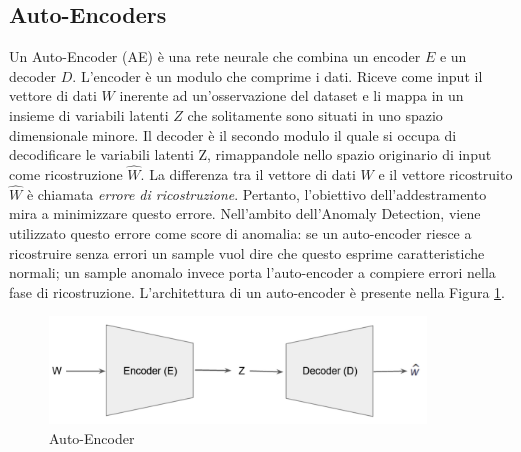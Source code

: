 \subsection{Auto-Encoders}
Un Auto-Encoder (AE) \cite{aggarwal2015outlier} è una rete neurale che combina un encoder $E$ e un decoder $D$. L'encoder è un modulo che comprime i dati. Riceve come input il vettore di dati $W$ inerente ad un'osservazione del dataset e li mappa in un insieme di variabili latenti $Z$ che solitamente sono situati in uno spazio dimensionale minore. Il decoder è il secondo modulo il quale si occupa di decodificare le variabili latenti Z, rimappandole nello spazio originario di input come ricostruzione $\widehat{W}$. La differenza tra il vettore di dati $W$ e il vettore ricostruito $\widehat{W}$ è chiamata \textit{errore di ricostruzione}. Pertanto, l'obiettivo dell'addestramento mira a minimizzare questo errore. Nell'ambito dell'Anomaly Detection, viene utilizzato questo errore come score di anomalia: se un auto-encoder riesce a ricostruire senza errori un sample vuol dire che questo esprime caratteristiche normali; un sample anomalo invece porta l'auto-encoder a compiere errori nella fase di ricostruzione. L'architettura di un auto-encoder è presente nella Figura \ref{ae}.
\begin{figure}[t]
	\centering
	\includegraphics[width=10cm, scale=1]{images/ae}
	\caption{Auto-Encoder}
	\label{ae}
\end{figure}
